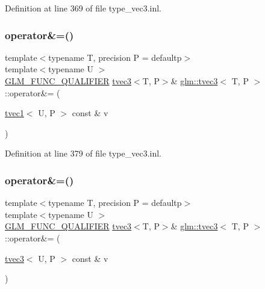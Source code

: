 Definition at line 369 of file type\+\_\+vec3.\+inl.

\mbox{\label{structglm_1_1tvec3_a2553d75c1533a163ed6526f903e8a061}} 
\subsubsection{\texorpdfstring{operator\&=()}{operator\&=()}\hspace{0.1cm}{\footnotesize\ttfamily [5/6]}}
{\footnotesize\ttfamily template$<$typename T, precision P = defaultp$>$ \\
template$<$typename U $>$ \\
\mbox{\hyperlink{setup_8hpp_a33fdea6f91c5f834105f7415e2a64407}{G\+L\+M\+\_\+\+F\+U\+N\+C\+\_\+\+Q\+U\+A\+L\+I\+F\+I\+ER}} \mbox{\hyperlink{structglm_1_1tvec3}{tvec3}}$<$T, P$>$\& \mbox{\hyperlink{structglm_1_1tvec3}{glm\+::tvec3}}$<$ T, P $>$\+::operator\&= (\begin{DoxyParamCaption}\item[{\mbox{\hyperlink{structglm_1_1tvec1}{tvec1}}$<$ U, P $>$ const \&}]{v }\end{DoxyParamCaption})}



Definition at line 379 of file type\+\_\+vec3.\+inl.

\mbox{\label{structglm_1_1tvec3_a6ce7276861f4b1402c5dcf4324fac897}} 
\subsubsection{\texorpdfstring{operator\&=()}{operator\&=()}\hspace{0.1cm}{\footnotesize\ttfamily [6/6]}}
{\footnotesize\ttfamily template$<$typename T, precision P = defaultp$>$ \\
template$<$typename U $>$ \\
\mbox{\hyperlink{setup_8hpp_a33fdea6f91c5f834105f7415e2a64407}{G\+L\+M\+\_\+\+F\+U\+N\+C\+\_\+\+Q\+U\+A\+L\+I\+F\+I\+ER}} \mbox{\hyperlink{structglm_1_1tvec3}{tvec3}}$<$T, P$>$\& \mbox{\hyperlink{structglm_1_1tvec3}{glm\+::tvec3}}$<$ T, P $>$\+::operator\&= (\begin{DoxyParamCaption}\item[{\mbox{\hyperlink{structglm_1_1tvec3}{tvec3}}$<$ U, P $>$ const \&}]{v }\end{DoxyParamCaption})}



